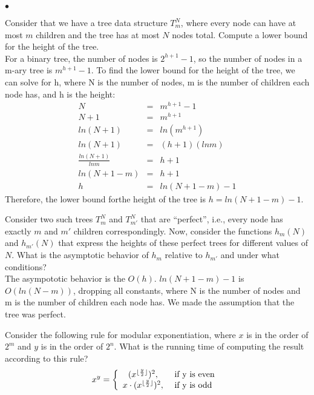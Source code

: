 \documentclass{article}
\newenvironment{myitem}{\begin{list}{$\bullet$}
{\setlength{\itemsep}{-0pt}
\setlength{\topsep}{0pt}
\setlength{\labelwidth}{0pt}
\setlength{\leftmargin}{10pt}
\setlength{\parsep}{-0pt}
\setlength{\itemsep}{0pt}
\setlength{\partopsep}{0pt}}}%
{\end{list}}
\begin{document}
\begin{myitem}
\item Consider that we have a tree data structure $T_m^N$, where every
  node can have at most $m$ children and the tree has at most $N$
  nodes total. Compute a lower bound for the height of the tree.\\

For a binary tree, the number of nodes is $2^{h+1}-1$, so the number of nodes in a m-ary tree is $m^{h+1}-1$. To find the lower bound for the height of the tree, we can solve for h, where N is the number of nodes, m is the number of children each node has, and h is the height:
\begin{eqnarray*}
	N &=& m^{h+1}-1\\
	N+1 &=& m^{h+1}\\
	ln(N+1) &=& ln(m^{h+1})\\
	ln(N+1) &=& (h+1)(lnm)\\
	\frac{ln(N+1)}{lnm} &=& h+1\\
	ln(N+1-m) &=& h+1\\
	h &=& ln(N+1-m)-1
\end{eqnarray*}
Therefore, the lower bound forthe height of the tree is $h=ln(N+1-m)-1$.\\

\item Consider two such trees $T_m^N$ and $T_{m'}^N$ that are
  ``perfect'', i.e., every node has exactly $m$ and $m'$ children
  correspondingly. Now, consider the functions $h_m(N)$ and
  $h_{m'}(N)$ that express the heights of these perfect trees for
  different values of $N$. What is the asymptotic behavior of $h_m$
  relative to $h_{m'}$ and under what conditions?\\

The asympototic behavior is the $O(h)$. $ln(N+1-m)-1$ is $O(ln(N-m))$, dropping all constants, where N is the number of nodes and m is the number of children each node has. We made the assumption that the tree was perfect. \\

\item Consider the following rule for modular exponentiation, where
  $x$ is in the order of $2^m$ and $y$ is in the order of $2^n$. What
  is the running time of computing the result according to this rule?
$$x^y = \left\{
\begin{array}{c l}     
    (x ^{\lfloor \frac{y}{2} \rfloor} )^2,  & \textrm{ if y is even }\\
    x \cdot (x^{\lfloor \frac{y}{2} \rfloor} )^2, & \textrm{ if y is odd}
\end{array}\right.$$


\end{myitem}
\end{document}
